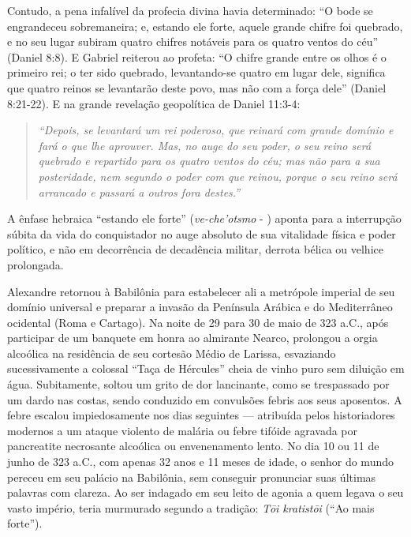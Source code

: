 \documentclass[11pt,a4paper,openany]{book}
\begin{document}
Contudo, a pena infalível da profecia divina havia determinado:
``O bode se engrandeceu sobremaneira; e, estando ele forte, aquele grande chifre foi quebrado, e no seu lugar subiram quatro chifres notáveis para os quatro ventos do céu'' (Daniel 8:8).
E Gabriel reiterou ao profeta:
``O chifre grande entre os olhos é o primeiro rei; o ter sido quebrado, levantando-se quatro em lugar dele, significa que quatro reinos se levantarão deste povo, mas não com a força dele'' (Daniel 8:21-22).
E na grande revelação geopolítica de Daniel 11:3-4:

\begin{quote}
\itshape ``Depois, se levantará um rei poderoso, que reinará com grande domínio e fará o que lhe aprouver. Mas, no auge do seu poder, o seu reino será quebrado e repartido para os quatro ventos do céu; mas não para a sua posteridade, nem segundo o poder com que reinou, porque o seu reino será arrancado e passará a outros fora destes.''
\end{quote}


A ênfase hebraica ``estando ele forte'' (\textit{ve-che'otsmo} - ) aponta para a interrupção súbita da vida do conquistador no auge absoluto de sua vitalidade física e poder político, e não em decorrência de decadência militar, derrota bélica ou velhice prolongada.

Alexandre retornou à Babilônia para estabelecer ali a metrópole imperial de seu domínio universal e preparar a invasão da Península Arábica e do Mediterrâneo ocidental (Roma e Cartago). Na noite de 29 para 30 de maio de 323 a.C., após participar de um banquete em honra ao almirante Nearco, prolongou a orgia alcoólica na residência de seu cortesão Médio de Larissa, esvaziando sucessivamente a colossal ``Taça de Hércules'' cheia de vinho puro sem diluição em água. Subitamente, soltou um grito de dor lancinante, como se trespassado por um dardo nas costas, sendo conduzido em convulsões febris aos seus aposentos. A febre escalou impiedosamente nos dias seguintes — atribuída pelos historiadores modernos a um ataque violento de malária ou febre tifóide agravada por pancreatite necrosante alcoólica ou envenenamento lento. No dia 10 ou 11 de junho de 323 a.C., com apenas 32 anos e 11 meses de idade, o senhor do mundo pereceu em seu palácio na Babilônia, sem conseguir pronunciar suas últimas palavras com clareza. Ao ser indagado em seu leito de agonia a quem legava o seu vasto império, teria murmurado segundo a tradição: \textit{Tōi kratistōi} (``Ao mais forte'').
\end{document}
